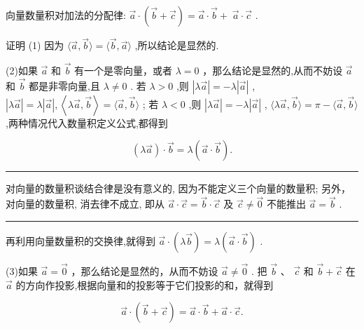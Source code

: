 \documentclass[10pt]{article}
\newcommand{\HRule}{\begin{center}\rule{0.9\linewidth}{0.2mm}\end{center}}
\begin{document}
向量数量积对加法的分配律: \(\overrightarrow{a} \cdot  \left( {\overrightarrow{b} + \overrightarrow{c}}\right)  = \overrightarrow{a} \cdot  \overrightarrow{b} + \; \overrightarrow{a} \cdot  \overrightarrow{c}\) .

证明 (1) 因为 \(\langle \overrightarrow{a},\overrightarrow{b}\rangle  = \langle \overrightarrow{b},\overrightarrow{a}\rangle\) ,所以结论是显然的.

(2)如果 \(\overrightarrow{a}\) 和 \(\overrightarrow{b}\) 有一个是零向量，或者 \(\lambda  = 0\) ，那么结论是显然的,从而不妨设 \(\overrightarrow{a}\) 和 \(\overrightarrow{b}\) 都是非零向量,且 \(\lambda  \neq  0\) . 若 \(\lambda  > 0\) ,则 \(\left| {\lambda \overrightarrow{a}}\right|  =  - \lambda \left| \overrightarrow{a}\right|\) , \(\left| {\lambda \overrightarrow{a}}\right|  = \lambda \left| \overrightarrow{a}\right| ,\left\langle  {\lambda \overrightarrow{a},\overrightarrow{b}}\right\rangle   = \langle \overrightarrow{a},\overrightarrow{b}\rangle\) ; 若 \(\lambda  < 0\) ,则 \(\left| {\lambda \overrightarrow{a}}\right|  =  - \lambda \left| \overrightarrow{a}\right|\) , \(\langle \lambda \overrightarrow{a},\overrightarrow{b}\rangle  = \pi  - \langle \overrightarrow{a},\overrightarrow{b}\rangle\) ,两种情况代入数量积定义公式,都得到

\[
\left( {\lambda \overrightarrow{a}}\right)  \cdot  \overrightarrow{b} = \lambda \left( {\overrightarrow{a} \cdot  \overrightarrow{b}}\right) .
\]

\HRule

对向量的数量积谈结合律是没有意义的, 因为不能定义三个向量的数量积; 另外，对向量的数量积, 消去律不成立, 即从 \(\overrightarrow{a} \cdot  \overrightarrow{c} = \overrightarrow{b} \cdot  \overrightarrow{c}\) 及 \(\overrightarrow{c} \neq  \overrightarrow{0}\) 不能推出 \(\overrightarrow{a} = \overrightarrow{b}\) .

\HRule

再利用向量数量积的交换律,就得到 \(\overrightarrow{a} \cdot  \left( {\lambda \overrightarrow{b}}\right)  = \lambda \left( {\overrightarrow{a} \cdot  \overrightarrow{b}}\right)\) .

(3)如果 \(\overrightarrow{a} = \overrightarrow{0}\) ，那么结论是显然的，从而不妨设 \(\overrightarrow{a} \neq  \overrightarrow{0}\) . 把 \(\overrightarrow{b}\text{ 、 }\overrightarrow{c}\) 和 \(\overrightarrow{b} + \overrightarrow{c}\) 在 \(\overrightarrow{a}\) 的方向作投影,根据向量和的投影等于它们投影的和，就得到

\[
\overrightarrow{a} \cdot  \left( {\overrightarrow{b} + \overrightarrow{c}}\right)  = \overrightarrow{a} \cdot  \overrightarrow{b} + \overrightarrow{a} \cdot  \overrightarrow{c}.
\]
\end{document}
